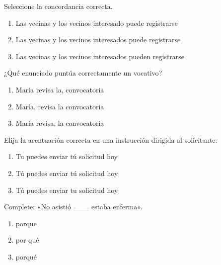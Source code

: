 \noindent\begin{minipage}{\linewidth}\setlength{\parskip}{4pt}\label{q:E-017}
Seleccione la concordancia correcta.
\begin{enumerate}[label=\Alph*),nosep]
\item Las vecinas y los vecinos interesado puede registrarse
\item Las vecinas y los vecinos interesados puede registrarse
\item Las vecinas y los vecinos interesados pueden registrarse
\end{enumerate}\end{minipage}\par\medskip

\noindent\begin{minipage}{\linewidth}\setlength{\parskip}{4pt}\label{q:E-018}
¿Qué enunciado puntúa correctamente un vocativo?
\begin{enumerate}[label=\Alph*),nosep]
\item María revisa la, convocatoria
\item María, revisa la convocatoria
\item María revisa, la convocatoria
\end{enumerate}\end{minipage}\par\medskip

\noindent\begin{minipage}{\linewidth}\setlength{\parskip}{4pt}\label{q:E-019}
Elija la acentuación correcta en una instrucción dirigida al solicitante.
\begin{enumerate}[label=\Alph*),nosep]
\item Tu puedes enviar tú solicitud hoy
\item Tú puedes enviar tú solicitud hoy
\item Tú puedes enviar tu solicitud hoy
\end{enumerate}\end{minipage}\par\medskip

\noindent\begin{minipage}{\linewidth}\setlength{\parskip}{4pt}\label{q:E-020}
Complete: «No asistió \_\_\_ estaba enferma».
\begin{enumerate}[label=\Alph*),nosep]
\item porque
\item por qué
\item porqué
\end{enumerate}\end{minipage}\par\medskip

